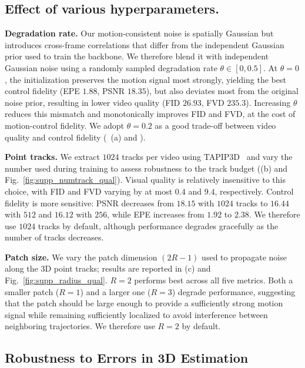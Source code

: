 \subsection{Effect of various hyperparameters.}
\label{sec:robust_3d}
\noindent\textbf{Degradation rate.}
Our motion-consistent noise is spatially Gaussian but introduces cross-frame correlations that differ from the independent Gaussian prior used to train the backbone. We therefore blend it with independent Gaussian noise using a randomly sampled degradation rate $\theta \in [0,0.5]$. At $\theta=0$, the initialization preserves the motion signal most strongly, yielding the best control fidelity (EPE $1.88$, PSNR $18.35$), but also deviates most from the original noise prior, resulting in lower video quality (FID $26.93$, FVD $235.3$). Increasing $\theta$ reduces this mismatch and monotonically improves FID and FVD, at the cost of motion-control fidelity. We adopt $\theta=0.2$ as a good trade-off between video quality and control fidelity (~(a) and ).

\noindent\textbf{Point tracks.}
We extract $1024$ tracks per video using TAPIP3D~\citep{tapip3d} and vary the number used during training to assess robustness to the track budget ((b) and Fig.~\ref{fig:supp_numtrack_qual}). Visual quality is relatively insensitive to this choice, with FID and FVD varying by at most $0.4$ and $9.4$, respectively. Control fidelity is more sensitive: PSNR decreases from $18.15$ with $1024$ tracks to $16.44$ with $512$ and $16.12$ with $256$, while EPE increases from $1.92$ to $2.38$. We therefore use $1024$ tracks by default, although performance degrades gracefully as the number of tracks decreases.

\noindent\textbf{Patch size.}
We vary the patch dimension $(2R-1)$ used to propagate noise along the 3D point tracks; results are reported in (c) and Fig.~\ref{fig:supp_radius_qual}. $R=2$ performs best across all five metrics. Both a smaller patch ($R=1$) and a larger one ($R=3$) degrade performance, suggesting that the patch should be large enough to provide a sufficiently strong motion signal while remaining sufficiently localized to avoid interference between neighboring trajectories. We therefore use $R=2$ by default.


\subsection{Robustness to Errors in 3D Estimation}
\label{sec:robust_3d}

